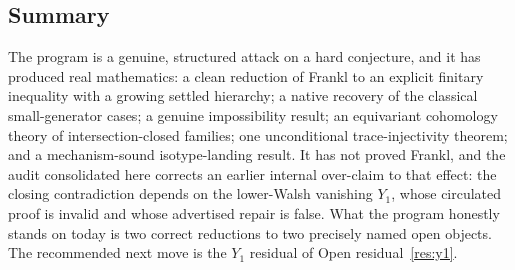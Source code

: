 \subsection{Summary}
\label{ssec:final-summary}

The program is a genuine, structured attack on a hard conjecture, and
it has produced real mathematics: a clean reduction of Frankl to an
explicit finitary inequality with a growing settled hierarchy; a native
recovery of the classical small-generator cases; a genuine
impossibility result; an equivariant cohomology theory of
intersection-closed families; one unconditional trace-injectivity
theorem; and a mechanism-sound isotype-landing result. It has not
proved Frankl, and the audit consolidated here corrects an earlier
internal over-claim to that effect: the closing contradiction depends
on the lower-Walsh vanishing $Y_1$, whose circulated proof is invalid
and whose advertised repair is false. What the program honestly stands
on today is two correct reductions to two precisely named open objects.
The recommended next move is the $Y_1$ residual of
Open residual~\ref{res:y1}.
